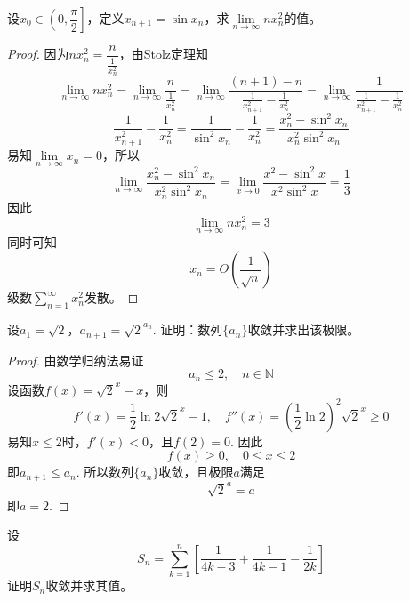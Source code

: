 \begin{proposition}

    设$x_0 \in \left( 0, \dfrac{\pi}{2} \right]$，定义$x_{n + 1} = \sin{x_n}$，求$\lim\limits_{n \to\infty}{nx_n^2}$的值。

\end{proposition}

\begin{proof}

    因为$nx_n^2 = \dfrac{n}{\frac{1}{x_n^2}}$，由\textup{Stolz}定理知
    $$\lim\limits_{n \to\infty}{nx_n^2} = \lim\limits_{n \to \infty}{\dfrac{n}{\frac{1}{x_n^2}}} = \lim\limits_{n \to \infty}{\dfrac{(n + 1) - n}{\frac{1}{x_{n + 1}^2} - \frac{1}{x_n^2}}} = \lim\limits_{n \to \infty}{\dfrac{1}{\frac{1}{x_{n + 1}^2} - \frac{1}{x_n^2}}}$$
    $$\dfrac{1}{x_{n + 1}^2} - \dfrac{1}{x_n^2} = \dfrac{1}{\sin^2{x_n}} - \dfrac{1}{x_n^2} = \dfrac{x_n^2 - \sin^2{x_n}}{x_n^2 \sin^2{x_n}}$$
    易知$\lim\limits_{n \to \infty}{x_n} = 0$，所以
    $$\lim\limits_{n \to \infty}{\dfrac{x_n^2 - \sin^2{x_n}}{x_n^2 \sin^2{x_n}}} = \lim\limits_{x \to 0}{\dfrac{x^2 - \sin^2{x}}{x^2 \sin^2{x}}} = \dfrac{1}{3}$$
    因此
    $$\lim\limits_{n \to\infty}{nx_n^2} = 3$$
    同时可知
    $$x_n = O\left( \dfrac{1}{\sqrt{n}} \right)$$
    级数$\sum\limits_{n = 1}^{\infty}{x_n^2}$发散。

\end{proof}

\begin{proposition}

    设$a_1 = \sqrt{2}$，$a_{n + 1} = {\sqrt{2}}^{a_n}$. 证明：数列$\{a_n\}$收敛并求出该极限。

\end{proposition}

\begin{proof}

    由数学归纳法易证
    $$a_n \leq 2, \quad n \in \mathbb{N}$$
    设函数$f(x) = {\sqrt{2}}^x - x$，则
    $$f'(x) = \dfrac{1}{2}\ln2 {\sqrt{2}}^x - 1, \quad f''(x) = \left( \dfrac{1}{2}\ln 2 \right)^2 {\sqrt{2}}^x \geq 0$$
    易知$x \leq 2$时，$f'(x) < 0$，且$f(2) = 0$. 因此
    $$f(x) \geq 0, \quad 0 \leq x \leq 2$$
    即$a_{n + 1} \leq a_n$. 所以数列$\{a_n\}$收敛，且极限$a$满足
    $${\sqrt{2}}^{a} = a$$
    即$a = 2$.

\end{proof}

\begin{proposition}

    设$$S_{n} = \sum\limits_{k = 1}^{n} \left[ \dfrac{1}{4k - 3} + \dfrac{1}{4k - 1} - \dfrac{1}{2k} \right]$$
    证明$S_{n}$收敛并求其值。

\end{proposition}

